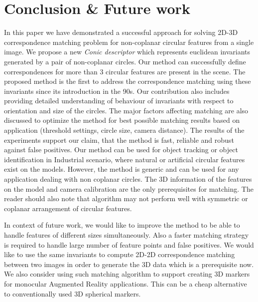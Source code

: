 \documentclass{bmvc2k}
\begin{document}
\section{Conclusion \& Future work }
In this paper we have demonstrated a successful approach for solving 2D-3D correspondence matching problem for non-coplanar circular features from a single image. 
We propose a new \textit{Conic descriptor} which represents euclidean invariants generated by a pair of non-coplanar circles.
Our method can successfully define correspondences for more than 3 circular features are present in the scene. 
The proposed method is the first to address the correspondence matching using these invariants since its introduction in the 90s.
Our contribution also includes providing detailed understanding of behaviour of invariants with respect to orientation and size of the circles. The major factors affecting matching are also discussed to optimize the method for best possible matching results based on application (threshold settings, circle size, camera distance). 
The results of the experiments support our claim, that the method is fast, reliable and robust against false positives.
Our method can be used for object tracking or object identification in Industrial scenario, where natural or artificial circular features exist on the models. However, the method is generic and can be used for any application dealing with non coplanar circles. 
The 3D information of the features on the model and camera calibration are the only prerequisites for matching. 
The reader should also note that algorithm may not perform well with symmetric or coplanar arrangement of circular features. 

In context of future work, we would like to improve the method to be able to handle features of different sizes simultaneously.
Also a faster matching strategy is required to handle large number of feature points and false positives. We would like to use the same invariants to compute 2D-2D correspondence matching between two images in order to generate the 3D data which is a prerequisite now. We also consider using such matching algorithm to support creating 3D markers for monocular Augmented Reality applications. This can be a cheap alternative to conventionally used 3D spherical markers.  



\end{document}
